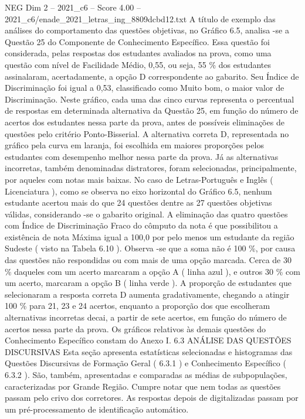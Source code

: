 \begin{textsample}{NEG Dim 2 – 2021\_c6 – Score 4.00 – 2021\_c6/enade\_2021\_letras\_ing\_8809dcbd12.txt}
A título de exemplo das análises do comportamento das questões objetivas, no Gráfico 6.5, analisa -se a Questão 25 do Componente de Conhecimento Específico.
Essa questão foi considerada, pelas respostas dos estudantes avaliados na prova, como uma questão com nível de Facilidade Médio, 0,55, ou seja, 55 \% dos estudantes assinalaram, acertadamente, a opção D correspondente ao gabarito.
Seu Índice de Discriminação foi igual a 0,53, classificado como Muito bom, o maior valor de Discriminação.
Neste gráfico, cada uma das cinco curvas representa o percentual de respostas em determinada alternativa da Questão 25, em função do número de acertos dos estudantes nessa parte da prova, antes de possíveis eliminações de questões pelo critério Ponto-Bisserial.
A alternativa correta D, representada no gráfico pela curva em laranja, foi escolhida em maiores proporções pelos estudantes com desempenho melhor nessa parte da prova.
Já as alternativas incorretas, também denominadas distratores, foram selecionadas, principalmente, por aqueles com notas mais baixas.
No caso de Letras-Português e Inglês ( Licenciatura ), como se observa no eixo horizontal do Gráfico 6.5, nenhum estudante acertou mais do que 24 questões dentre as 27 questões objetivas válidas, considerando -se o gabarito original.
A eliminação das quatro questões com Índice de Discriminação Fraco do cômputo da nota é que possibilitou a existência de nota Máxima igual a 100,0 por pelo menos um estudante da região Sudeste ( visto na Tabela 6.10 ).
Observa -se que a soma não é 100 \%, por causa das questões não respondidas ou com mais de uma opção marcada.
Cerca de 30 \% daqueles com um acerto marcaram a opção A ( linha azul ), e outros 30 \% com um acerto, marcaram a opção B ( linha verde ).
A proporção de estudantes que selecionaram a resposta correta D aumenta gradativamente, chegando a atingir 100 \% para 21, 23 e 24 acertos, enquanto a proporção dos que escolheram alternativas incorretas decai, a partir de sete acertos, em função do número de acertos nessa parte da prova.
Os gráficos relativos às demais questões do Conhecimento Específico constam do Anexo I. 6.3 ANÁLISE DAS QUESTÕES DISCURSIVAS Esta seção apresenta estatísticas selecionadas e histogramas das Questões Discursivas de Formação Geral ( 6.3.1 ) e Conhecimento Específico ( 6.3.2 ).
São, também, apresentadas e comparadas as médias de subpopulações, caracterizadas por Grande Região.
Cumpre notar que nem todas as questões passam pelo crivo dos corretores.
As respostas depois de digitalizadas passam por um pré-processamento de identificação automático.

\end{textsample}

